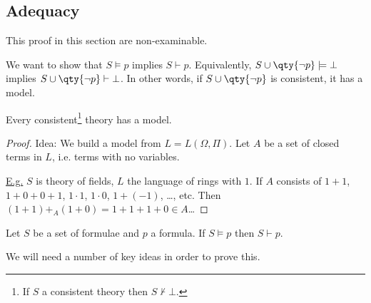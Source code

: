 \subsection{Adequacy}
This proof in this section are non-examinable.

We want to show that $S \models p$ implies $S \vdash p$.
Equivalently, $S \cup \qty{\neg p} \models \bot$ implies $S \cup \qty{\neg p} \vdash \bot$.
In other words, if $S \cup \qty{\neg p}$ is consistent, it has a model.

\begin{theorem} \label{thm:predmodel}
    Every consistent\footnote{If $S$ a consistent theory then $S \not\vdash \bot$.} theory has a model.
\end{theorem}

\begin{proof}
    Idea: We build a model from $L = L(\Omega, \Pi)$.
    Let $A$ be a set of closed terms in $L$, i.e. terms with no variables.

    \underline{E.g.} $S$ is theory of fields, $L$ the language of rings with $1$.
    If $A$ consists of $1+1$, $1+0+0+1$, $1 \cdot 1$, $1 \cdot 0$, $1 + (-1)$, \dots, etc.
    Then $(1 + 1) +_A (1 + 0) = 1 + 1 + 1 + 0 \in A$\dots
\end{proof}

\begin{corollary}[Adequacy]
    Let $S$ be a set of formulae and $p$ a formula.
    If $S \models p$ then $S \vdash p$.
\end{corollary}


We will need a number of key ideas in order to prove this.

